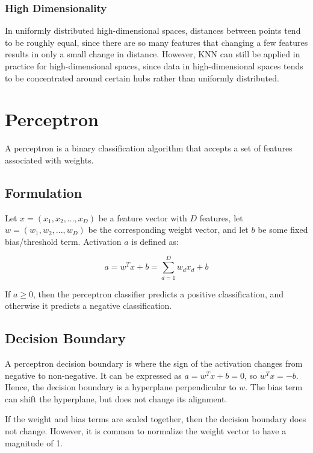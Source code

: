 \documentclass[12pt,titlepage]{article}
\let\stdsection\section
\renewcommand\section{\clearpage\stdsection}
\begin{document}
      \subsubsection{High Dimensionality}
        In uniformly distributed high-dimensional spaces, distances between points tend to be roughly equal, since there are so many features that changing a few
        features results in only a small change in distance. However, KNN can still be applied in practice for high-dimensional spaces, since data in high-dimensional
        spaces tends to be concentrated around certain hubs rather than uniformly distributed.

  \section{Perceptron}

    A perceptron is a binary classification algorithm that accepts a set of features associated with weights.

    \subsection{Formulation}
      Let $x = (x_1, x_2, ..., x_D)$ be a feature vector with $D$ features, let $w = (w_1, w_2, ..., w_D)$ be the corresponding weight vector, and let $b$ be some fixed
      bias/threshold term. Activation $a$ is defined as:

      $$a = w^Tx + b = \sum_{d=1}^Dw_dx_d + b$$

      If $a \geq 0$, then the perceptron classifier predicts a positive classification, and otherwise it predicts a negative classification.

    \subsection{Decision Boundary}

      A perceptron decision boundary is where the sign of the activation changes from negative to non-negative. It can be expressed as $a = w^Tx + b = 0$, so $w^Tx = -b$.
      Hence, the decision boundary is a hyperplane perpendicular to $w$. The bias term can shift the hyperplane, but does not change its alignment.

      If the weight and bias terms are scaled together, then the decision boundary does not change. However, it is common to normalize the weight vector to have a magnitude
      of 1.
\end{document}
